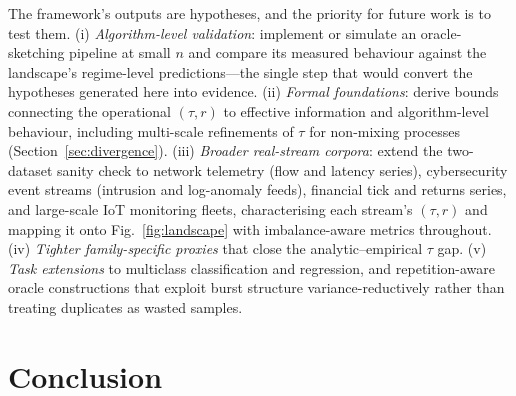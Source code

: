 \documentclass[sensors,article,submit,pdftex,moreauthors]{Definitions/mdpi}
\providecommand{\DIFadd}[1]{{\protect\color{blue}#1}} %
\providecommand{\DIFdel}[1]{} %
\providecommand{\DIFaddbegin}{} %
\providecommand{\DIFaddend}{} %
\providecommand{\DIFdelbegin}{} %
\providecommand{\DIFdelend}{} %
\begin{document}
\DIFdelbegin \DIFdel{Future work should pursue: }\DIFdelend \DIFaddbegin \DIFadd{The framework's outputs are hypotheses, and the priority for future work is to test them. }\DIFaddend (i) \DIFdelbegin \DIFdel{tighter, family-specific correlation characterizations that close the proxy--empirical $\tau$ gap; }\DIFdelend \DIFaddbegin \emph{\DIFadd{Algorithm-level validation}}\DIFadd{: implement or simulate an oracle-sketching pipeline at small $n$ and compare its measured behaviour against the landscape's regime-level predictions---the single step that would convert the hypotheses generated here into evidence. }\DIFaddend (ii) \DIFdelbegin \DIFdel{extending the }\DIFdelend \DIFaddbegin \emph{\DIFadd{Formal foundations}}\DIFadd{: derive bounds connecting the operational $(\tau, r)$ to effective information and algorithm-level behaviour, including multi-scale refinements of $\tau$ for non-mixing processes (Section~\ref{sec:divergence}). (iii) }\emph{\DIFadd{Broader real-stream corpora}}\DIFadd{: extend the }\DIFaddend two-dataset \DIFdelbegin \DIFdel{real-stream sanity check in Section~\ref{sec:real_stream} to financial, network-traffic, }\DIFdelend \DIFaddbegin \DIFadd{sanity check to network telemetry (flow and latency series), cybersecurity event streams (intrusion and log-anomaly feeds), financial tick and returns series, }\DIFaddend and \DIFdelbegin \DIFdel{additional sensor streams, characterising their }\DIFdelend \DIFaddbegin \DIFadd{large-scale IoT monitoring fleets, characterising each stream's }\DIFaddend $(\tau, r)$ \DIFdelbegin \DIFdel{parameters and mapping them }\DIFdelend \DIFaddbegin \DIFadd{and mapping it }\DIFaddend onto Fig.~\ref{fig:landscape} with imbalance-aware metrics throughout\DIFdelbegin \DIFdel{; (iii) formal verification of the proxy formulas against the exact framework's correlation parameters; (}\DIFdelend \DIFaddbegin \DIFadd{. (}\DIFaddend iv) \DIFdelbegin \DIFdel{extension }\DIFdelend \DIFaddbegin \emph{\DIFadd{Tighter family-specific proxies}} \DIFadd{that close the analytic--empirical $\tau$ gap. (v) }\emph{\DIFadd{Task extensions}} \DIFaddend to multiclass classification and regression\DIFdelbegin \DIFdel{; and (v) }\DIFdelend \DIFaddbegin \DIFadd{, and }\DIFaddend repetition-aware oracle constructions that exploit burst structure variance-reductively rather than treating duplicates as wasted samples.


\section{Conclusion}
\label{sec:conclusion}
\end{document}
